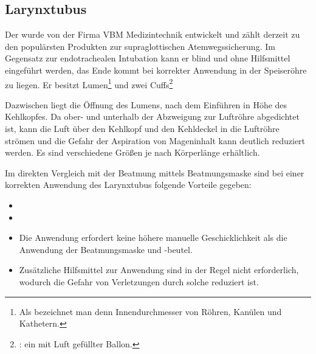 \documentclass[
ngerman,
paper=a4,
asymmetric,
fontsize=10pt,
draft=false,
numbers=noenddot,
bibtotocnumbered,
footnotes=multiple,
]{scrreprt}
\begin{document}
\subsection{Larynxtubus}
 Der  wurde von der Firma VBM
 Medizintechnik entwickelt und zählt derzeit zu den
 populärsten Produkten zur supraglottischen
 Atemwegssicherung. Im Gegensatz zur endotrachealen
 Intubation kann er blind und ohne Hilfsmittel eingeführt
 werden, das Ende kommt bei korrekter Anwendung in der
 Speiseröhre zu liegen. Er besitzt 
 Lumen\footnote{Als  bezeichnet man denn
 Innendurchmesser von Röhren, Kanülen und Kathetern.} und
 zwei Cuffs\footnote{:
ein mit Luft gefüllter Ballon.}

 Dazwischen liegt die Öffnung des Lumens, nach dem Einführen
 in Höhe des Kehlkopfes. Da ober- und unterhalb der
 Abzweigung zur Luftröhre abgedichtet ist, kann die Luft über
 den Kehlkopf und den Kehldeckel in die Luftröhre strömen und
 die Gefahr der Aspiration von Mageninhalt kann deutlich
 reduziert werden. Es sind verschiedene Größen je nach
 Körperlänge erhältlich.
 \cite{Asai2005} %
 
 Im direkten Vergleich mit der Beatmung mittels
 Beatmungsmaske
 sind bei einer korrekten Anwendung des Larynxtubus{\texttrademark} folgende
 Vorteile gegeben:
 
 \begin{itemize}
  \item {}
  \item {}
   \item Die Anwendung erfordert keine höhere manuelle
   Geschicklichkeit als die Anwendung der Beatmungsmaske und
   -beutel.
   \item Zusätzliche Hilfsmittel zur Anwendung sind in der
   Regel nicht erforderlich, wodurch die Gefahr von
   Verletzungen durch solche reduziert ist.
 \end{itemize}
 
\end{document}
